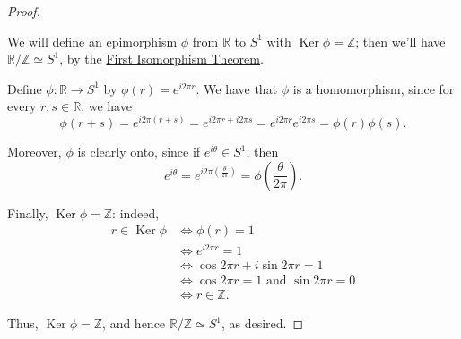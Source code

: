 \documentclass[10pt,openany,oneside]{book}
\theoremstyle{plain}
\theoremstyle{definition}
\theoremstyle{definition}
\theoremstyle{definition}
\theoremstyle{definition}
\numberwithin{equation}{section}
\def\Z{\mathbb{Z}}
\def\R{\mathbb{R}}
\DeclareMathOperator{\Ker}{Ker}
\newcommand{\amp}{&}
\begin{document}
\begin{proof}\hypertarget{proof-52}{}
We will define an epimorphism \(\phi\) from \(\R\) to \(S^1\) with \(\Ker \phi=\Z\); then we'll have \(\R/\Z \simeq S^1\), by the \hyperref[fit]{First Isomorphism Theorem}.%
\par
Define \(\phi:\R \to S^1\) by \(\phi(r)=e^{i2\pi r}\). We have that \(\phi\) is a homomorphism, since for every \(r,s\in \R\), we have%
\begin{equation*}
\phi(r+s)=e^{i2\pi (r+s)}=e^{i2\pi r+i2\pi s}=e^{i2\pi
r}e^{i2\pi s}=\phi(r)\phi(s).
\end{equation*}
%
\par
Moreover, \(\phi\) is clearly onto, since if \(e^{i\theta}\in S^1\), then%
\begin{equation*}
e^{i\theta}=e^{i2\pi\left(\frac{\theta}{2\pi}\right)}=\phi\left(\frac{\theta}{2\pi}\right).
\end{equation*}
%
\par
Finally, \(\Ker\phi=\Z\): indeed,%
\begin{align*}
r\in \Ker\phi \amp \Leftrightarrow \phi(r)=1\\
\amp \Leftrightarrow e^{i2\pi r}=1\\
\amp \Leftrightarrow \cos 2\pi r + i\sin 2\pi r=1\\
\amp \Leftrightarrow \cos 2\pi r = 1 \text{ and } \sin 2\pi r = 0\\
\amp \Leftrightarrow r\in \Z.
\end{align*}
%
\par
Thus, \(\Ker \phi = \Z\), and hence \(\R/\Z\simeq S^1\), as desired.%
\end{proof}
\typeout{************************************************}
\typeout{************************************************}
\end{document}
